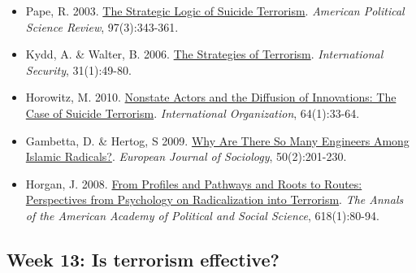 \documentclass[12pt,]{article}
\providecommand{\tightlist}{%
  \setlength{\itemsep}{0pt}\setlength{\parskip}{0pt}}
\begin{document}
\begin{itemize}
\tightlist
\item
  Pape, R. 2003.
  \href{https://www.cambridge.org/core/journals/american-political-science-review/article/strategic-logic-of-suicide-terrorism/A6F51C77E3DE644EBD20ADE176973547}{The
  Strategic Logic of Suicide Terrorism}. \emph{American Political
  Science Review}, 97(3):343-361.
\item
  Kydd, A. \& Walter, B. 2006.
  \href{https://www.mitpressjournals.org/doi/abs/10.1162/isec.2006.31.1.49}{The
  Strategies of Terrorism}. \emph{International Security}, 31(1):49-80.
\item
  Horowitz, M. 2010.
  \href{https://www.cambridge.org/core/journals/international-organization/article/nonstate-actors-and-the-diffusion-of-innovations-the-case-of-suicide-terrorism/9D060458C614C2BBD8322ED5D444AA32}{Nonstate
  Actors and the Diffusion of Innovations: The Case of Suicide
  Terrorism}. \emph{International Organization}, 64(1):33-64.
\item
  Gambetta, D. \& Hertog, S 2009.
  \href{https://www.cambridge.org/core/journals/european-journal-of-sociology-archives-europeennes-de-sociologie/article/why-are-there-so-many-engineers-among-islamic-radicals/91ED8BEFDE3793834667750B31575422}{Why
  Are There So Many Engineers Among Islamic Radicals?}. \emph{European
  Journal of Sociology}, 50(2):201-230.
\item
  Horgan, J. 2008.
  \href{http://journals.sagepub.com/doi/abs/10.1177/0002716208317539}{From
  Profiles and Pathways and Roots to Routes: Perspectives from
  Psychology on Radicalization into Terrorism}. \emph{The Annals of the
  American Academy of Political and Social Science}, 618(1):80-94.
\end{itemize}

\hypertarget{week-13-is-terrorism-effective}{%
\subsection{Week 13: Is terrorism
effective?}\label{week-13-is-terrorism-effective}}
\end{document}
